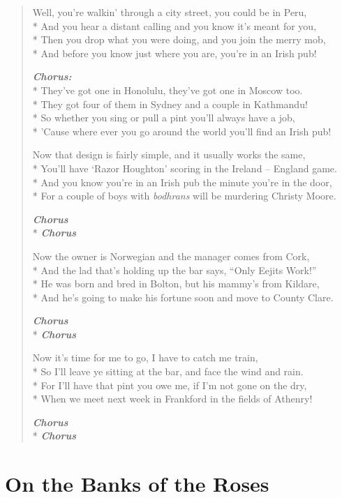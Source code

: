 \documentclass[9pt,twoside]{extarticle}
\makeatletter
\newenvironment{xverse}{
	\begin{verse}
	\fontsize{8.5}{10.5}\selectfont
}{
	\end{verse}
}
\newcommand{\chorusdef}{\textbf{\emph{Chorus:}}\\*}
\newcommand{\chorus@mark}[1][1]{%
\textbf{\emph{Chorus \ifthenelse{\equal{#1}{1}}{}{$\times$ #1}}}%
}
\newcommand{\chorusmark}[1][1]{%
\ifvmode%
\vspace{-0.5\stanzaskip}%
\chorus@mark[#1]%
\vspace{-0.5\stanzaskip}%
\else \\*%
\chorus@mark[#1]%
\fi%
}
\makeatother
\begin{document}
\begin{xverse}
Well, you’re walkin’ through a city street, you could be in Peru, \\*
And you hear a distant calling and you know it’s meant for you, \\*
Then you drop what you were doing, and you join the merry mob, \\*
And before you know just where you are, you’re in an Irish pub!

\chorusdef
They’ve got one in Honolulu, they’ve got one in Moscow too. \\*
They got four of them in Sydney and a couple in Kathmandu! \\*
So whether you sing or pull a pint you’ll always have a job, \\*
’Cause where ever you go around the world you’ll find an Irish pub!

Now that design is fairly simple, and it usually works the same, \\*
You’ll have ‘Razor Houghton’ scoring in the Ireland -- England game. \\*
And you know you’re in an Irish pub the minute you’re in the door, \\*
For a couple of boys with \textit{bodhrans} will be murdering Christy Moore.

\chorusmark

Now the owner is Norwegian and the manager comes from Cork, \\*
And the lad that’s holding up the bar says, “Only Eejits Work!” \\*
He was born and bred in Bolton, but his mammy’s from Kildare, \\*
And he’s going to make his fortune soon and move to County Clare.

\chorusmark

Now it’s time for me to go, I have to catch me train, \\*
So I’ll leave ye sitting at the bar, and face the wind and rain. \\*
For I’ll have that pint you owe me, if I’m not gone on the dry, \\*
When we meet next week in Frankford in the fields of Athenry!

\chorusmark[2]
\end{xverse}

\section{On the Banks of the Roses}
\end{document}
